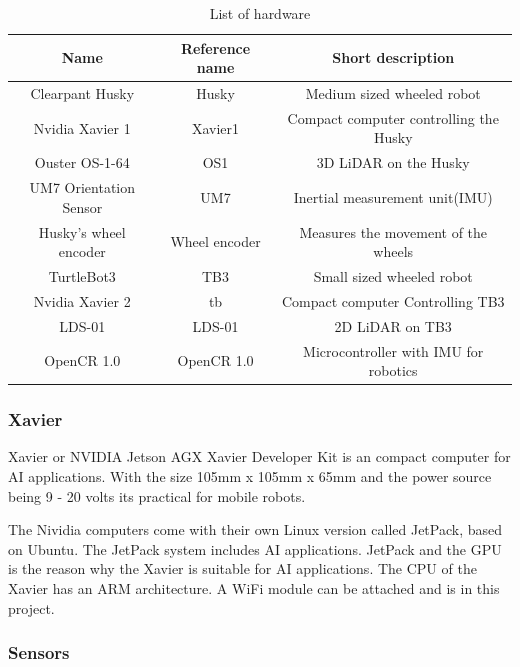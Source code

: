 \begin{table}[H]
    \centering
    \begin{tabular}{c|c|c}
        Name                    & Reference name    & Short description  \\ \hline
        Clearpant Husky         & Husky             & Medium sized wheeled robot \\
        Nvidia Xavier 1         & Xavier1           & Compact computer controlling the Husky\\
        Ouster OS-1-64          & OS1               & 3D LiDAR on the Husky \\
        UM7 Orientation Sensor  & UM7               & Inertial measurement unit(IMU)  \\
        Husky's wheel encoder   & Wheel encoder     & Measures the movement of the wheels\\
        TurtleBot3              & TB3               & Small sized wheeled robot   \\
        Nvidia Xavier 2         & tb                & Compact computer Controlling TB3  \\
        LDS-01                  & LDS-01            & 2D LiDAR on TB3 \\
        OpenCR 1.0              & OpenCR 1.0        & Microcontroller with IMU for robotics \\
        
    \end{tabular}
    \caption{List of hardware}
    \label{tab:HW_list}
\end{table}

\subsubsection{Xavier}
Xavier or NVIDIA Jetson AGX Xavier Developer Kit \cite{xavierguide} is an compact computer for AI applications. With the size 105mm x 105mm x 65mm and the power source being 9 - 20 volts its practical for mobile robots. 

The Nividia computers come with their own Linux version called JetPack, based on Ubuntu. The JetPack system includes AI applications. JetPack and the GPU is the reason why the Xavier is suitable for AI applications. The CPU of the Xavier has an ARM architecture. A WiFi module can be attached and is in this project.

\subsubsection{Sensors}

